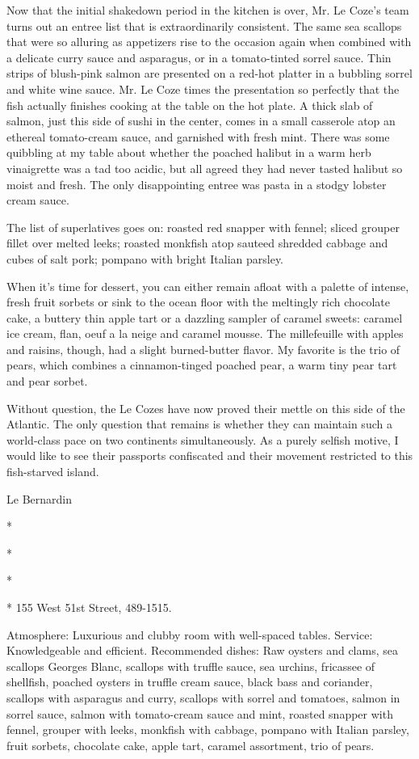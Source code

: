 Now that the initial shakedown period in the kitchen is over, Mr. Le
Coze's team turns out an entree list that is extraordinarily consistent.
The same sea scallops that were so alluring as appetizers rise to the
occasion again when combined with a delicate curry sauce and asparagus,
or in a tomato-tinted sorrel sauce. Thin strips of blush-pink salmon are
presented on a red-hot platter in a bubbling sorrel and white wine
sauce. Mr. Le Coze times the presentation so perfectly that the fish
actually finishes cooking at the table on the hot plate. A thick slab of
salmon, just this side of sushi in the center, comes in a small
casserole atop an ethereal tomato-cream sauce, and garnished with fresh
mint. There was some quibbling at my table about whether the poached
halibut in a warm herb vinaigrette was a tad too acidic, but all agreed
they had never tasted halibut so moist and fresh. The only disappointing
entree was pasta in a stodgy lobster cream sauce.

The list of superlatives goes on: roasted red snapper with fennel;
sliced grouper fillet over melted leeks; roasted monkfish atop sauteed
shredded cabbage and cubes of salt pork; pompano with bright Italian
parsley.

When it's time for dessert, you can either remain afloat with a palette
of intense, fresh fruit sorbets or sink to the ocean floor with the
meltingly rich chocolate cake, a buttery thin apple tart or a dazzling
sampler of caramel sweets: caramel ice cream, flan, oeuf a la neige and
caramel mousse. The millefeuille with apples and raisins, though, had a
slight burned-butter flavor. My favorite is the trio of pears, which
combines a cinnamon-tinged poached pear, a warm tiny pear tart and pear
sorbet.

Without question, the Le Cozes have now proved their mettle on this side
of the Atlantic. The only question that remains is whether they can
maintain such a world-class pace on two continents simultaneously. As a
purely selfish motive, I would like to see their passports confiscated
and their movement restricted to this fish-starved island.

Le Bernardin

*

*

*

* 155 West 51st Street, 489-1515.

Atmosphere: Luxurious and clubby room with well-spaced tables. Service:
Knowledgeable and efficient. Recommended dishes: Raw oysters and clams,
sea scallops Georges Blanc, scallops with truffle sauce, sea urchins,
fricassee of shellfish, poached oysters in truffle cream sauce, black
bass and coriander, scallops with asparagus and curry, scallops with
sorrel and tomatoes, salmon in sorrel sauce, salmon with tomato-cream
sauce and mint, roasted snapper with fennel, grouper with leeks,
monkfish with cabbage, pompano with Italian parsley, fruit sorbets,
chocolate cake, apple tart, caramel assortment, trio of pears.

